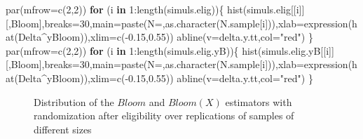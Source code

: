 \documentclass[
]{book}
\newenvironment{Shaded}{\begin{snugshade}}{\end{snugshade}}
\newcommand{\AttributeTok}[1]{\textcolor[rgb]{0.77,0.63,0.00}{#1}}
\newcommand{\ControlFlowTok}[1]{\textcolor[rgb]{0.13,0.29,0.53}{\textbf{#1}}}
\newcommand{\DecValTok}[1]{\textcolor[rgb]{0.00,0.00,0.81}{#1}}
\newcommand{\FloatTok}[1]{\textcolor[rgb]{0.00,0.00,0.81}{#1}}
\newcommand{\FunctionTok}[1]{\textcolor[rgb]{0.00,0.00,0.00}{#1}}
\newcommand{\NormalTok}[1]{#1}
\newcommand{\SpecialCharTok}[1]{\textcolor[rgb]{0.00,0.00,0.00}{#1}}
\newcommand{\StringTok}[1]{\textcolor[rgb]{0.31,0.60,0.02}{#1}}
\theoremstyle{definition}
\theoremstyle{definition}
\theoremstyle{definition}
\theoremstyle{definition}
\theoremstyle{remark}
\begin{document}
\begin{Shaded}
\begin{Highlighting}[]
\FunctionTok{par}\NormalTok{(}\AttributeTok{mfrow=}\FunctionTok{c}\NormalTok{(}\DecValTok{2}\NormalTok{,}\DecValTok{2}\NormalTok{))}
\ControlFlowTok{for}\NormalTok{ (i }\ControlFlowTok{in} \DecValTok{1}\SpecialCharTok{:}\FunctionTok{length}\NormalTok{(simuls.elig))\{}
  \FunctionTok{hist}\NormalTok{(simuls.elig[[i]][,}\StringTok{\textquotesingle{}Bloom\textquotesingle{}}\NormalTok{],}\AttributeTok{breaks=}\DecValTok{30}\NormalTok{,}\AttributeTok{main=}\FunctionTok{paste}\NormalTok{(}\StringTok{\textquotesingle{}N=\textquotesingle{}}\NormalTok{,}\FunctionTok{as.character}\NormalTok{(N.sample[i])),}\AttributeTok{xlab=}\FunctionTok{expression}\NormalTok{(}\FunctionTok{hat}\NormalTok{(Delta}\SpecialCharTok{\^{}}\NormalTok{yBloom)),}\AttributeTok{xlim=}\FunctionTok{c}\NormalTok{(}\SpecialCharTok{{-}}\FloatTok{0.15}\NormalTok{,}\FloatTok{0.55}\NormalTok{))}
  \FunctionTok{abline}\NormalTok{(}\AttributeTok{v=}\NormalTok{delta.y.tt,}\AttributeTok{col=}\StringTok{"red"}\NormalTok{)}
\NormalTok{\}}
\FunctionTok{par}\NormalTok{(}\AttributeTok{mfrow=}\FunctionTok{c}\NormalTok{(}\DecValTok{2}\NormalTok{,}\DecValTok{2}\NormalTok{))}
\ControlFlowTok{for}\NormalTok{ (i }\ControlFlowTok{in} \DecValTok{1}\SpecialCharTok{:}\FunctionTok{length}\NormalTok{(simuls.elig.yB))\{}
  \FunctionTok{hist}\NormalTok{(simuls.elig.yB[[i]][,}\StringTok{\textquotesingle{}Bloom\textquotesingle{}}\NormalTok{],}\AttributeTok{breaks=}\DecValTok{30}\NormalTok{,}\AttributeTok{main=}\FunctionTok{paste}\NormalTok{(}\StringTok{\textquotesingle{}N=\textquotesingle{}}\NormalTok{,}\FunctionTok{as.character}\NormalTok{(N.sample[i])),}\AttributeTok{xlab=}\FunctionTok{expression}\NormalTok{(}\FunctionTok{hat}\NormalTok{(Delta}\SpecialCharTok{\^{}}\NormalTok{yBloom)),}\AttributeTok{xlim=}\FunctionTok{c}\NormalTok{(}\SpecialCharTok{{-}}\FloatTok{0.15}\NormalTok{,}\FloatTok{0.55}\NormalTok{))}
  \FunctionTok{abline}\NormalTok{(}\AttributeTok{v=}\NormalTok{delta.y.tt,}\AttributeTok{col=}\StringTok{"red"}\NormalTok{)}
\NormalTok{\}}
\end{Highlighting}
\end{Shaded}

\begin{figure}[htbp]

{\centering {}

}

\caption{Distribution of the $Bloom$ and $Bloom(X)$ estimators with randomization after eligibility over replications of samples of different sizes}\label{fig:montecarlohisteligbloom}
\end{figure}
\end{document}
